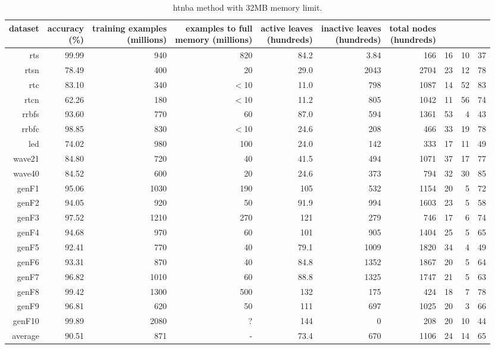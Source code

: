 \clearpage
\begin{table}
\caption{{\sc htnba} method with 32MB memory limit.}
\label{tab:htnba-32MB}
\centering
\begin{tabular}{|r|r|r|r|r|r|r|r|r|r|}
\hline
dataset	&
\rotatebox{90}{\parbox{9em}{accuracy\\(\%)}} &
\rotatebox{90}{\parbox{9em}{training examples\\(millions)}} &
\rotatebox{90}{\parbox{9em}{examples to full\\memory (millions)}} &
\rotatebox{90}{\parbox{9em}{active leaves\\(hundreds)}} &
\rotatebox{90}{\parbox{9em}{inactive leaves\\(hundreds)}} &
\rotatebox{90}{\parbox{9em}{total nodes\\(hundreds)}} &
\rotatebox{90}{\parbox{9em}{tree depth}}	&
\rotatebox{90}{\parbox{9em}{training speed (\%)}} &
\rotatebox{90}{\parbox{9em}{prediction speed (\%)}} \\
\hline
{\sc rts} & 99.99 & 940 & 820 & 84.2 & 3.84 & 166 & 16 & 10 & 37 \\
{\sc rtsn} & 78.49 & 400 & 20 & 29.0 & 2043 & 2704 & 23 & 12 & 78 \\
{\sc rtc} & 83.10 & 340 & $<$10 & 11.0 & 798 & 1087 & 14 & 52 & 83 \\
{\sc rtcn} & 62.26 & 180 & $<$10 & 11.2 & 805 & 1042 & 11 & 56 & 74 \\
{\sc rrbfs} & 93.60 & 770 & 60 & 87.0 & 594 & 1361 & 53 & 4 & 43 \\
{\sc rrbfc} & 98.85 & 830 & $<$10 & 24.6 & 208 & 466 & 33 & 19 & 78 \\
{\sc led} & 74.02 & 980 & 100 & 24.0 & 142 & 333 & 17 & 11 & 49 \\
{\sc wave21} & 84.80 & 720 & 40 & 41.5 & 494 & 1071 & 37 & 17 & 77 \\
{\sc wave40} & 84.52 & 600 & 20 & 24.6 & 373 & 794 & 32 & 30 & 85 \\
{\sc genF1} & 95.06 & 1030 & 190 & 105 & 532 & 1154 & 20 & 5 & 72 \\
{\sc genF2} & 94.05 & 920 & 50 & 91.9 & 994 & 1603 & 23 & 5 & 58 \\
{\sc genF3} & 97.52 & 1210 & 270 & 121 & 279 & 746 & 17 & 6 & 74 \\
{\sc genF4} & 94.68 & 970 & 60 & 101 & 905 & 1404 & 25 & 5 & 65 \\
{\sc genF5} & 92.41 & 770 & 40 & 79.1 & 1009 & 1820 & 34 & 4 & 49 \\
{\sc genF6} & 93.31 & 870 & 40 & 84.8 & 1352 & 1867 & 20 & 5 & 64 \\
{\sc genF7} & 96.82 & 1010 & 60 & 88.8 & 1325 & 1747 & 21 & 5 & 63 \\
{\sc genF8} & 99.42 & 1300 & 500 & 132 & 175 & 424 & 18 & 7 & 78 \\
{\sc genF9} & 96.81 & 620 & 50 & 111 & 697 & 1025 & 20 & 3 & 66 \\
{\sc genF10} & 99.89 & 2080 & ? & 144 & 0 & 208 & 20 & 10 & 44 \\
\hline
average & 90.51 & 871 &  -  & 73.4 & 670 & 1106 & 24 & 14 & 65 \\
\hline
\end{tabular}
\end{table}
